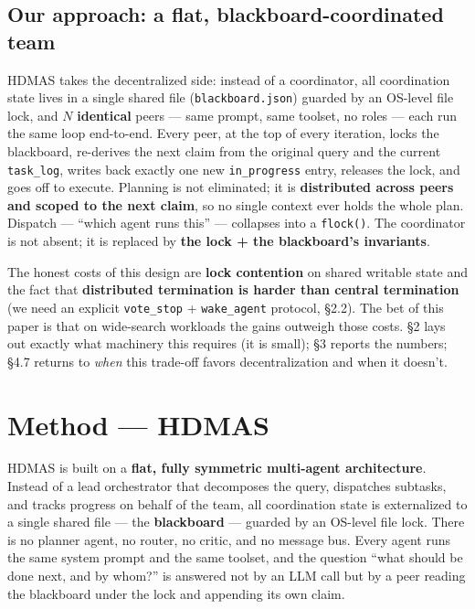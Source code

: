 \documentclass[11pt]{article}
\newcommand{\code}[1]{\texttt{#1}}
\begin{document}
\subsection{Our approach: a flat, blackboard-coordinated team}

HDMAS takes the decentralized side: instead of a coordinator, all coordination state lives in a single shared file (\code{blackboard.json}) guarded by an OS-level file lock, and $N$ \textbf{identical} peers --- same prompt, same toolset, no roles --- each run the same loop end-to-end. Every peer, at the top of every iteration, locks the blackboard, re-derives the next claim from the original query and the current \code{task\_log}, writes back exactly one new \code{in\_progress} entry, releases the lock, and goes off to execute. Planning is not eliminated; it is \textbf{distributed across peers and scoped to the next claim}, so no single context ever holds the whole plan. Dispatch --- ``which agent runs this'' --- collapses into a \code{flock()}. The coordinator is not absent; it is replaced by \textbf{the lock + the blackboard's invariants}.

The honest costs of this design are \textbf{lock contention} on shared writable state and the fact that \textbf{distributed termination is harder than central termination} (we need an explicit \code{vote\_stop} + \code{wake\_agent} protocol, \S2.2). The bet of this paper is that on wide-search workloads the gains outweigh those costs. \S2 lays out exactly what machinery this requires (it is small); \S3 reports the numbers; \S4.7 returns to \emph{when} this trade-off favors decentralization and when it doesn't.

\section{Method --- HDMAS}

HDMAS is built on a \textbf{flat, fully symmetric multi-agent architecture}. Instead of a lead orchestrator that decomposes the query, dispatches subtasks, and tracks progress on behalf of the team, all coordination state is externalized to a single shared file --- the \textbf{blackboard} --- guarded by an OS-level file lock. There is no planner agent, no router, no critic, and no message bus. Every agent runs the same system prompt and the same toolset, and the question ``what should be done next, and by whom?'' is answered not by an LLM call but by a peer reading the blackboard under the lock and appending its own claim.
\end{document}
